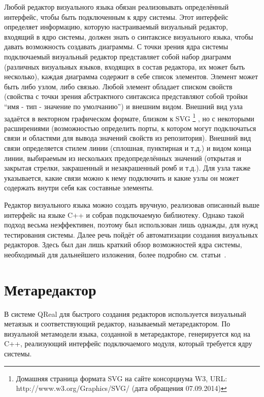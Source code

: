 Любой редактор визуального языка обязан реализовывать определённый интерфейс, чтобы 
быть подключенным к ядру системы. Этот интерфейс определяет информацию, которую настраиваемый 
визуальный редактор, входящий в ядро системы, должен знать о синтаксисе визуального 
языка, чтобы давать возможность создавать диаграммы. С точки зрения ядра системы подключаемый 
визуальный редактор представляет собой набор диаграмм (различных визуальных языков, 
входящих в состав редактора, их может быть несколько), каждая диаграмма содержит в 
себе список элементов. Элемент может быть либо узлом, либо связью. Любой элемент обладает 
списком свойств (свойства с точки зрения абстрактного синтаксиса представляют собой 
тройки "`имя - тип - значение по умолчанию"') и внешним видом. Внешний вид узла задаётся в векторном графическом формате, близком к SVG%
\footnote{Домашняя страница формата SVG на сайте консорциума W3, URL: http://www.w3.org/Graphics/SVG/ (дата обращения 07.09.2014)}%
, но с некоторыми расширениями (возможностью определить порты, к котором могут подключаться связи и областями для вывода значений 
свойств из репозитория). Внешний вид связи определяется стилем линии (сплошная, пунктирная 
и т.д.) и видом конца линии, выбираемым из нескольких предопределённых значений (открытая 
и закрытая стрелки, закрашенный и незакрашенный ромб и т.д.). Для узла также указывается, 
какие связи можно к нему подключить и какие узлы он может содержать внутри себя как 
составные элементы.

Редактор визуального языка можно создать вручную, реализовав описанный выше интерфейс 
на языке C++ и собрав подключаемую библиотеку. Однако такой подход весьма неэффективен, 
поэтому был использован лишь однажды, для нужд тестирования системы. Далее речь пойдёт 
об автоматизации создания визуальных редакторов. Здесь был дан лишь краткий обзор 
возможностей ядра системы, необходимый для дальнейшего изложения, более подробно 
см. статьи~\cite{terekhov2009architecture, kuzenkova2011qreal, kuzenkova2013qreal}.

\section{Метаредактор}
В системе QReal для быстрого создания редакторов используется визуальный метаязык и 
соответствующий редактор, называемый метаредактором. По визуальной метамодели языка, 
созданной в метаредакторе, генерируется код на C++, реализующий интерфейс подключаемого 
модуля, который требуется ядру системы.


